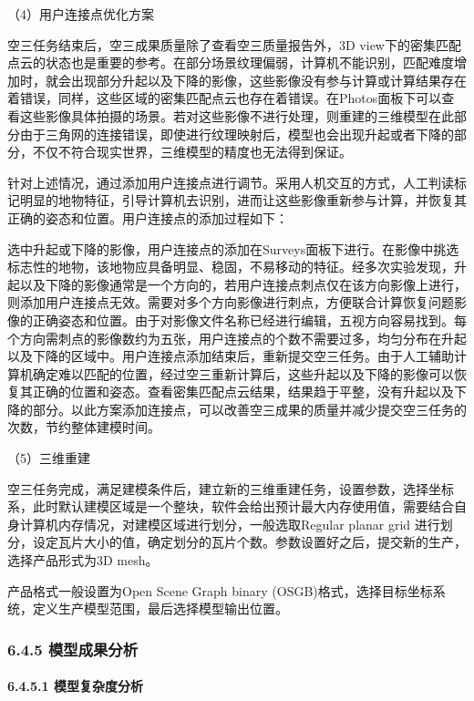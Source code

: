（4）用户连接点优化方案

空三任务结束后，空三成果质量除了查看空三质量报告外，3D view下的密集匹配点云的状态也是重要的参考。在部分场景纹理偏弱，计算机不能识别，匹配难度增加时，就会出现部分升起以及下降的影像，这些影像没有参与计算或计算结果存在着错误，同样，这些区域的密集匹配点云也存在着错误。在Photos面板下可以查看这些影像具体拍摄的场景。若对这些影像不进行处理，则重建的三维模型在此部分由于三角网的连接错误，即使进行纹理映射后，模型也会出现升起或者下降的部分，不仅不符合现实世界，三维模型的精度也无法得到保证。

针对上述情况，通过添加用户连接点进行调节。采用人机交互的方式，人工判读标记明显的地物特征，引导计算机去识别，进而让这些影像重新参与计算，并恢复其正确的姿态和位置。用户连接点的添加过程如下：

选中升起或下降的影像，用户连接点的添加在Surveys面板下进行。在影像中挑选标志性的地物，该地物应具备明显、稳固，不易移动的特征。经多次实验发现，升起以及下降的影像通常是一个方向的，若用户连接点刺点仅在该方向影像上进行，则添加用户连接点无效。需要对多个方向影像进行刺点，方便联合计算恢复问题影像的正确姿态和位置。由于对影像文件名称已经进行编辑，五视方向容易找到。每个方向需刺点的影像数约为五张，用户连接点的个数不需要过多，均匀分布在升起以及下降的区域中。用户连接点添加结束后，重新提交空三任务。由于人工辅助计算机确定难以匹配的位置，经过空三重新计算后，这些升起以及下降的影像可以恢复其正确的位置和姿态。查看密集匹配点云结果，结果趋于平整，没有升起以及下降的部分。以此方案添加连接点，可以改善空三成果的质量并减少提交空三任务的次数，节约整体建模时间。

（5）三维重建

空三任务完成，满足建模条件后，建立新的三维重建任务，设置参数，选择坐标系，此时默认建模区域是一个整块，软件会给出预计最大内存使用值，需要结合自身计算机内存情况，对建模区域进行划分，一般选取Regular planar grid 进行划分，设定瓦片大小的值，确定划分的瓦片个数。参数设置好之后，提交新的生产，选择产品形式为3D mesh。

产品格式一般设置为Open Scene Graph binary (OSGB)格式，选择目标坐标系统，定义生产模型范围，最后选择模型输出位置。

\hypertarget{ux6a21ux578bux6210ux679cux5206ux6790}{%
\subsubsection{6.4.5 模型成果分析}\label{ux6a21ux578bux6210ux679cux5206ux6790}}

\hypertarget{ux6a21ux578bux590dux6742ux5ea6ux5206ux6790}{%
\paragraph{6.4.5.1 模型复杂度分析}\label{ux6a21ux578bux590dux6742ux5ea6ux5206ux6790}}

